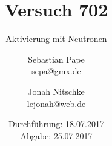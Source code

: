 

\title{Versuch 702}
\subtitle{Aktivierung mit Neutronen}
\author{Sebastian Pape\\
        sepa@gmx.de \and
        Jonah Nitschke\\
        lejonah@web.de}
\date{Durchführung: 18.07.2017\\
      Abgabe: 25.07.2017}



\maketitle






